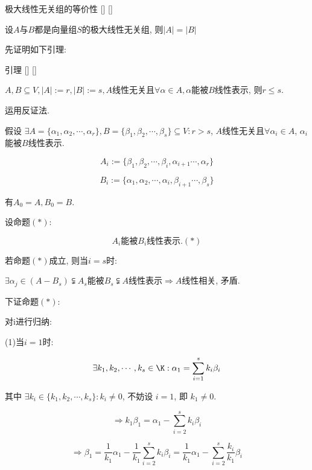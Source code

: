 \documentclass[UTF8]{ctexart}
\begin{document}
		\begin{thm}
			[]
			{极大线性无关组的等价性}
			[]
			[]

			设$A$与$B$都是向量组$S$的极大线性无关组, 则$|A|=|B|$
		\end{thm}
		\begin{prf}
		
			先证明如下引理: 
		\end{prf}
		\begin{lma}
			[]
			{引理}
			[]
			[]

			$A,B\subseteq V, |A|:=r, |B|:=s, A$线性无关且$\forall \alpha\in A, \alpha$能被$B$线性表示, 则$r\leq s$. 
		\end{lma}
		\begin{prf}
		
			运用反证法. 
			
			假设 $\exists A=\{\alpha_{1},\alpha_{2},\cdots, \alpha_{r}\},B=\{\beta_{1},\beta_{2},\cdots, \beta_{s}\}\subseteq V: r>s$, $A$线性无关且$\forall \alpha_{i}\in A$, $\alpha_{i}$能被$B$线性表示. 
			
			$$A_{i}:=\{\beta_{1},\beta_{2},\cdots, \beta_{i}, \alpha_{i+1}\cdots, \alpha_{r}\}$$
			
			$$B_{i}:=\{\alpha_{1},\alpha_{2},\cdots, \alpha_{i}, \beta_{i+1}\cdots, \beta_{s}\}$$
			
			有$A_{0}=A, B_{0}=B$. 
			
			设命题$(*)$: 
			
			$$A_{i}\mbox{能被}B_{i}\mbox{线性表示}. (*)$$
			
			若命题$(*)$成立, 则当$i=s$时: 
			
			$\exists \alpha_{j}\in (A-B_{s})\subsetneqq A_{s}$能被$B_{s}\subsetneqq A$线性表示$\Longrightarrow A$线性相关, 矛盾. 
			
			下证命题$(*)$: 
			
			对i进行归纳: 
			
			(1)当$i=1$时: 
			
			$$\exists k_{1},k_{2},\cdots, k_{s}\in \K: \alpha_{1}=\sum_{i=1}^{s}k_{i}\beta_{i}$$
			
			其中 $\exists k_{i}\in \{k_{1},k_{2},\cdots, k_{s}\} :k_{i}\neq 0$, 不妨设 $i=1$, 即 $k_{1}\neq 0$. 
			
			$$\Longrightarrow k_{1}\beta_{1}=\alpha_{1}-\sum_{i=2}^{s}k_{i}\beta_{i}$$
			
			$$\Longrightarrow \beta_{1}=\frac{1}{k_{1}}\alpha_{1}-\frac{1}{k_{1}}\sum_{i=2}^{s}k_{i}\beta_{i}=\frac{1}{k_{1}}\alpha_{1}-\sum_{i=2}^{s}\frac{k_{i}}{k_{1}}\beta_{i}$$
			

\end{prf}
\end{document}
